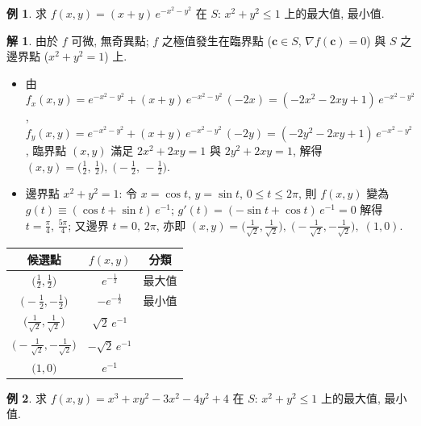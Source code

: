 \documentclass[12pt]{extarticle}
\newcommand{\ds}{\displaystyle}
\theoremstyle{definition}
\newtheorem*{ex}{例}
\newtheorem*{sol}{解}
\newcommand{\vc}{\mathbf{c}}
\begin{document}
\begin{ex}
  求 $\ds f(x, y) = (x + y)\,e^{-x^2 - y^2}$ 在 $S:\,x^2 + y^2 \leqslant 1$ 上的最大值, 最小值. 
\end{ex}

\begin{sol}
  由於 $f$ 可微, 無奇異點; $f$ 之極值發生在臨界點 ($\vc\in S,\,\nabla f(\vc) = 0$) 與 $S$ 之邊界點 ($x^2 + y^2 = 1$) 上. 
  \begin{itemize}\setlength\itemsep{0em}
    \item 由 $\ds f_x(x, y) = e^{-x^2 - y^2} + (x + y)\,e^{-x^2 - y^2}\,(-2x) = (-2 x^2 - 2xy + 1)\,e^{-x^2 - y^2}$, $\ds f_y(x, y) = e^{-x^2 - y^2} + (x + y)\,e^{-x^2 - y^2}\,(-2y) = (-2 y^2 - 2xy + 1)\,e^{-x^2 - y^2}$, 臨界點 $(x, y)$ 滿足 $\ds 2x^2 + 2xy = 1$ 與 $2y^2 + 2xy = 1$, 解得 $(x, y) = \big(\frac{1}{2},\,\frac{1}{2}\big),\;\big(-\frac{1}{2},\,-\frac{1}{2}\big)$. 
    \item 邊界點 $x^2 + y^2 = 1$: 令 $x = \cos t$, $y = \sin t$, $0\leqslant t\leqslant 2\pi$, 則 $f(x, y)$ 變為 $\ds g(t)\equiv(\cos t + \sin t)\,e^{-1}$; $g'(t) = (-\sin t + \cos t)\,e^{-1} = 0$ 解得 $t = \frac{\pi}{4},\,\frac{5\pi}{4}$; 又邊界 $t = 0,\,2\pi$, 亦即 $(x, y) = \big(\frac{1}{\sqrt{2}}, \frac{1}{\sqrt{2}}\big),\;\big(-\frac{1}{\sqrt{2}}, -\frac{1}{\sqrt{2}}\big),\;(1, 0)$.  
  \end{itemize}
  \begin{center}
  \renewcommand{\arraystretch}{1.3}
  \begin{tabular}{ccc}
    \toprule
    候選點 & $f(x, y)$ & 分類 \\    
    \midrule
    $\big(\frac{1}{2}, \frac{1}{2}\big)$  & $e^{-\frac{1}{2}}$ & 最大值\\ 
    $\big(-\frac{1}{2}, -\frac{1}{2}\big)$  & $-e^{-\frac{1}{2}}$ & 最小值\\ 
    $\big(\frac{1}{\sqrt{2}}, \frac{1}{\sqrt{2}}\big)$ & $\sqrt{2}\,e^{-1}$ &  \\ 
    $\big(-\frac{1}{\sqrt{2}}, -\frac{1}{\sqrt{2}}\big)$ & $-\sqrt{2}\,e^{-1}$ & \\ 
    $\big(1, 0\big)$ & $e^{-1}$ & \\ \bottomrule
  \end{tabular}
  \renewcommand{\arraystretch}{1.0}
  \end{center}
\end{sol}

\begin{ex}
  求 $\ds f(x, y) = x^3 + xy^2 - 3x^2 - 4y^2 + 4$ 在 $S:\,x^2 + y^2 \leqslant 1$ 上的最大值, 最小值. 
\end{ex}
\end{document}
